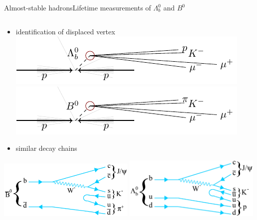 \documentclass[aspectratio=169]{beamer}
\begin{document}
\begin{frame}{Almost-stable hadrons}{Lifetime measurements of $\Lambda_b^0$ and $B^0$}
\begin{columns}
    \begin{column}{0.45\textwidth}
        \begin{itemize}
            \item identification of displaced vertex\\
            \includegraphics[scale=0.85]{inline-figs/collision.pdf}\\
            \includegraphics[scale=0.85]{inline-figs/collision_to_B0.pdf}
            \item similar decay chains
        \end{itemize}
        \centering
        \includegraphics[width=0.49\textwidth]{figs/Lifetime/diagram_B.png}
        \includegraphics[width=0.49\textwidth]{figs/Lifetime/diagram_Lb.png}

\end{column}
\end{columns}
\end{frame}
\end{document}
